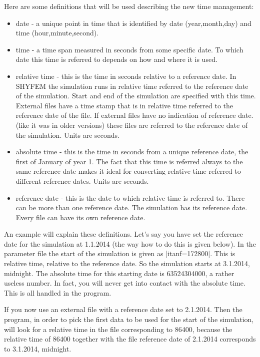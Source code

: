 \documentclass[12pt,draft]{article}
\newcommand{\shyfem}{SHYFEM}
\begin{document}
Here are some definitions that will be used describing
the new time management:
\begin{itemize}
\item date - a unique point in time that is identified by date
(year,month,day) and time (hour,minute,second).
\item time - a time span measured in seconds from some
specific date. To which date this time is referred to depends on how
and where it is used.
\item relative time - this is the time in seconds relative
to a reference date. In \shyfem{} the simulation runs in
relative time referred to the reference date of the simulation.
Start and end of the simulation are specified with
this time. External files have a time stamp that is in relative time
referred to the reference date of the file. If external files have no indication of reference date. 
(like it was in older versions) these files are referred to 
the reference date of the simulation. Units are seconds.
\item absolute time - this is the time in seconds from a unique
reference date, the
first of January of year 1. The fact that this time is referred
always to the same reference date makes it ideal for converting
relative time referred to different reference dates. Units are seconds.
\item reference date - this is the date to which relative time is referred to. There can be more than one reference date. The
simulation has its reference date. Every file can have its own 
reference date. 
\end{itemize}

An example will explain these definitions. Let's say you have 
set the reference date for the simulation at 1.1.2014 (the way
how to do this is given below). In the parameter file the start
of the simulation is given as |itanf=172800|. This is relative time,
relative to the reference date. So the simulation starts at
3.1.2014, midnight. The absolute time for this starting date
is 63524304000, a rather useless number. In fact, you will never get 
into contact with the absolute time. This is all handled in
the program.

If you now use an external file with a reference date set to
2.1.2014. Then the program, in order to pick the first data
to be used for the start of the simulation, will look for a
relative time in the file corresponding to 86400, because the
relative time of 86400 together with the file reference date
of 2.1.2014 corresponds to 3.1.2014, midnight.
\end{document}
